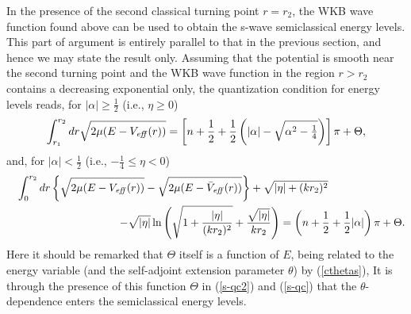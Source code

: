 \documentclass[a4paper,aps,eqsecnum,preprint,preprintnumbers,12pt]{revtex4}
\begin{document}
In the presence of the second classical turning point $r=r_{2}$,
the WKB wave function found above can be used to obtain the s-wave
semiclassical energy levels. This part of argument is entirely
parallel to that in the previous section, and hence we may state
the result only. Assuming that the potential is smooth near the
second turning point and the WKB wave function in the region
$r>r_{2}$ contains a decreasing exponential only, the quantization
condition for energy levels reads, for $|\alpha| \geq
\displaystyle \frac{1}{2}$ (i.e., $\eta \geq 0$)
\begin{equation} \label{s-qc2}
\int_{r_{1}}^{r_{2}} dr \sqrt{ 2\mu ( E - V_{\it eff}(r) ) } =
\left[ n + \frac{1}{2} + \frac{1}{2} \left( |\alpha| - \sqrt{
\alpha^{2} - \textstyle \frac{1}{4} } \right) \right] \pi +
\Theta,
\end{equation}
and, for $|\alpha| < \displaystyle \frac{1}{2}$ (i.e., $-
\displaystyle \frac{1}{4} \leq \eta < 0$)
\begin{eqnarray} \label{s-qc}
&& \int_{0}^{r_{2}} dr \left\{ \sqrt{ 2\mu ( E - V_{\it eff}(r) )
} - \sqrt{ 2\mu ( E - \bar{V}_{\it eff}(r) ) } \right\} + \sqrt{
|\eta| + (kr_{2})^{2} } \hspace{2.5cm} \nonumber \\
&& \;\;\;\;\; - \sqrt{|\eta|} \ln \left( \sqrt{ 1 +
\frac{|\eta|}{(kr_{2})^{2}} } + \frac{\sqrt{|\eta|}}{kr_{2}}
\right) = \left( n + \frac{1}{2} + \frac{1}{2} |\alpha| \right)
\pi + \Theta.
\end{eqnarray}
Here it should be remarked that $\Theta$ itself is a function of
$E$, being related to the energy variable (and the self-adjoint
extension parameter $\theta$) by (\ref{cthetas}), It is through
the presence of this function $\Theta$ in (\ref{s-qc2}) and
(\ref{s-qc}) that the $\theta$-dependence enters the semiclassical
energy levels.
\end{document}
